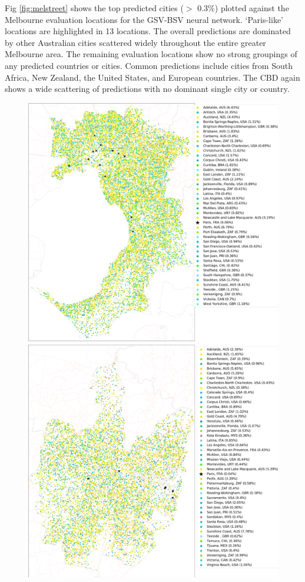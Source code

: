 \documentclass[Crown,sageh,times]{sagej}
\begin{document}
Fig \ref{fig:melstreet} shows the top predicted cities ($>$ 0.3\%) plotted against the Melbourne evaluation locations for the GSV-BSV neural network. `Paris-like' locations are highlighted in 13 locations. The overall predictions are dominated by other Australian cities scattered widely throughout the entire greater Melbourne area. The remaining evaluation locations show no strong groupings of any predicted countries or cities. Common predictions include cities from South Africa, New Zealand, the United States, and European countries. The CBD again shows a wide scattering of predictions with no dominant single city or country.



\begin{figure}[!htbp]
\centering    
\includegraphics[scale=0.16]{Images/PlosOne/Fig9.png} 

\end{figure}
\end{document}
